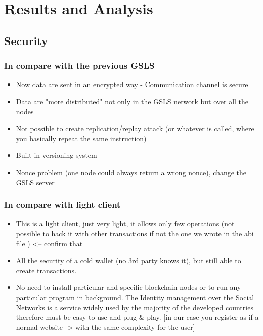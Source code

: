 \section{Results and Analysis}
\label{S:5}


\subsection{Security}

\subsubsection{In compare with the previous GSLS}

\begin{itemize}
  \item Now data are sent in an encrypted way - Communication channel is secure
  \item Data are "more distributed" not only in the GSLS network but over all the nodes
  \item Not possible to create replication/replay attack (or whatever is called, where you basically repeat the same instruction)
  \item Built in versioning system
  \item Nonce problem (one node could always return a wrong nonce), change the GSLS server
\end{itemize}

\subsubsection{In compare with light client}
\begin{itemize}
  \item This is a light client, just very light, it allows only few operations (not possible to hack it with other transactions if not the one we wrote in the abi file ) <-- confirm that
  \item All the security of a cold wallet (no 3rd party knows it), but still able to create transactions.
  \item No need to install particular and specific blockchain nodes or to run any particular program in background. The Identity management over the Social Networks is a service widely used by the majority of the developed countries therefore must be easy to use and plug & play. [in our case you register as if a normal website -> with the same complexity for the user]
\end{itemize}
